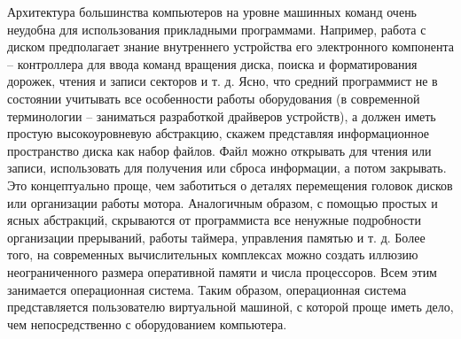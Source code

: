 Архитектура большинства компьютеров на уровне машинных команд очень неудобна для использования прикладными программами. Например, работа с диском предполагает знание внутреннего устройства его электронного компонента – контроллера для ввода команд вращения диска, поиска и форматирования дорожек, чтения и записи секторов и т. д. Ясно, что средний программист не в состоянии учитывать все особенности работы оборудования (в современной терминологии – заниматься разработкой драйверов устройств), а должен иметь простую высокоуровневую абстракцию, скажем представляя информационное пространство диска как набор файлов. Файл можно открывать для чтения или записи, использовать для получения или сброса информации, а потом закрывать. Это концептуально проще, чем заботиться о деталях перемещения головок дисков или организации работы мотора. Аналогичным образом, с помощью простых и ясных абстракций, скрываются от программиста все ненужные подробности организации прерываний, работы таймера, управления памятью и т. д. Более того, на современных вычислительных комплексах можно создать иллюзию неограниченного размера оперативной памяти и числа процессоров. Всем этим занимается операционная система. Таким образом, операционная система представляется пользователю виртуальной машиной, с которой проще иметь дело, чем непосредственно с оборудованием компьютера.

